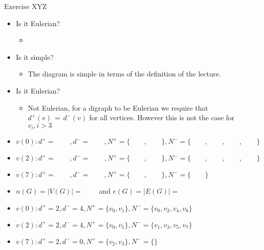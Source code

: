 \begin{frame}{Exercise \thesection}{XYZ\vspace{0.5cm}}
\begin{solutionnoinc}
\begin{itemize}
\begin{itemize}
      \end{itemize}
      \item Is it Eulerian?
      \begin{itemize}
        \item[]
      \end{itemize}
    \end{itemize}
  \end{solutionnoinc}
  \begin{solution}
    \begin{itemize}
      \item Is it simple?
      \begin{itemize}
        \item The diagram is simple in terms of the definition of the lecture.
      \end{itemize}
      \item Is it Eulerian?
      \begin{itemize}
        \item Not Eulerian, for a digraph to be Eulerian we require that $d^{+}(v)\,=\,d^{-}(v)$ for all vertices. However this is not the case for $v_i, i > 3$
      \end{itemize}
    \end{itemize}
  \end{solution}
  \begin{solutionnoinc}
    \begin{itemize}
      \item $v(0): d^{+}=\qquad ,d^{-}=\qquad ,N^{+}=\{\qquad, \qquad\},N^{-}=\{\qquad ,\qquad ,\qquad ,\qquad \}$
      \item $v(2): d^{+}=\qquad ,d^{-}=\qquad ,N^{+}=\{\qquad, \qquad\},N^{-}=\{\qquad ,\qquad ,\qquad ,\qquad \}$
      \item $v(7): d^{+}=\qquad ,d^{-}=\qquad ,N^{+}=\{\qquad, \qquad\},N^{-}=\{\qquad \}$
      \item $n(G)=|V(G)|=\qquad$ and $e(G)=|E(G)|=\qquad$
    \end{itemize}
  \end{solutionnoinc}
  \begin{solution}
    \begin{itemize}
      \item $v(0): d^{+}=2,d^{-}=4,N^{+}=\{v_{0},v_{1}\},N^{-}=\{v_{0},v_{2},v_{4},v_{6}\}$
      \item $v(2): d^{+}=2,d^{-}=4,N^{+}=\{v_{0},v_{1}\},N^{-}=\{v_{1},v_{3},v_{5},v_{7}\}$
      \item $v(7): d^{+}=2,d^{-}=0,N^{+}=\{v_{2},v_{3}\},N^{-}=\{\}$

\end{itemize}
\end{solution}
\end{frame}
